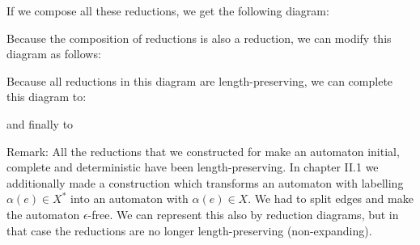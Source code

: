 If we compose all these reductions, we get the following diagram:

\begin{center}
\end{center}

Because the composition of reductions is also a reduction, we can modify this
diagram as follows:

\begin{center}
\end{center}

Because all reductions in this diagram are length-preserving, we can complete
this diagram to:

\begin{center}
\end{center}

and finally to

\begin{center}
\end{center}

Remark: All the reductions that we constructed for make an automaton initial,
complete and deterministic have been length-preserving. In chapter II.1 we
additionally made a construction which transforms an automaton with labelling
$\alpha(e) \in X^*$ into an automaton with $\alpha(e) \in X$. We had to split
edges and make the automaton $\epsilon$-free. We can represent this also by
reduction diagrams, but in that case the reductions are no longer
length-preserving (non-expanding).

